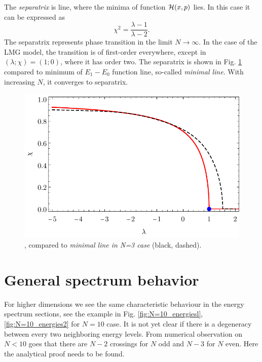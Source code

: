 The \emph{separatrix} is line, where the minima of function $\mathcal{H}(x,p)$ lies. In this case it can be expressed as
\begin{equation}
    \chi^2=\frac{\lambda-1}{\lambda-2}.
    \label{eq:separatrix}
\end{equation}
The separatrix represents phase transition in the limit $N\rightarrow \infty$. In the case of the LMG model, the transition is of first-order everywhere, except in $(\lambda;\chi)=(1;0)$, where it has order two. The separatrix is shown in Fig. \ref{fig:transitionCompare} compared to minimum of $E_1-E_0$ function line, so-called \emph{minimal line}. With increasing $N$, it converges to separatrix.

\begin{figure}[H]
    \centering
    \includegraphics{../img/infiniteN_transitionCompare.pdf}
    \caption{,  compared to \emph{minimal line in N=3 case} (black, dashed).}
    \label{fig:transitionCompare}    
\end{figure}












\section{General spectrum behavior}
For higher dimensions we see the same characteristic behaviour in the energy spectrum sections, see the example in Fig. \ref{fig:N=10_energiesl}, \ref{fig:N=10_energies2} for $N=10$ case. It is not yet clear if there is a degeneracy between every two neighboring energy levels. From numerical observation on $N<10$ goes that there are $N-2$ crossings for $N$ odd and $N-3$ for $N$ even. Here the analytical proof needs to be found.


